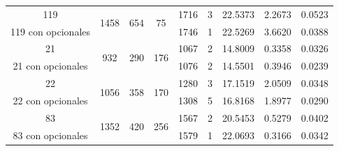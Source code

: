 \begin{table}[htbp]
{\begin{tabular}{ccccccccc}
119                & \multirow{2}{*}{1458} & \multirow{2}{*}{654} & \multirow{2}{*}{75}  & 1716   & 3           & 22.5373                                                            & 2.2673                                                                        & 0.0523                                                                 \\
119 con opcionales &                       &                      &                      & 1746   & 1           & 22.5269                                                            & 3.6620                                                                        & 0.0388                                                                 \\ \hline
21                 & \multirow{2}{*}{932}  & \multirow{2}{*}{290} & \multirow{2}{*}{176} & 1067   & 2           & 14.8009                                                            & 0.3358                                                                        & 0.0326                                                                 \\
21 con opcionales  &                       &                      &                      & 1076   & 2           & 14.5501                                                            & 0.3946                                                                        & 0.0239                                                                 \\ \hline
22                 & \multirow{2}{*}{1056} & \multirow{2}{*}{358} & \multirow{2}{*}{170} & 1280   & 3           & 17.1519                                                            & 2.0509                                                                        & 0.0348                                                                 \\
22 con opcionales  &                       &                      &                      & 1308   & 5           & 16.8168                                                            & 1.8977                                                                        & 0.0290                                                                 \\ \hline
83                 & \multirow{2}{*}{1352} & \multirow{2}{*}{420} & \multirow{2}{*}{256} & 1567   & 2           & 20.5453                                                            & 0.5279                                                                        & 0.0402                                                                 \\
83 con opcionales  &                       &                      &                      & 1579   & 1           & 22.0693                                                            & 0.3166                                                                        & 0.0342                                                                 \\ \hline
\end{tabular}%
}
\end{table}

